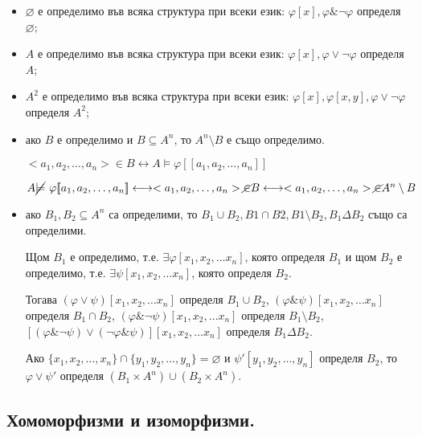 \documentclass{article}
\begin{document}
\begin{prop}
$\ $
\begin{itemize}
\item $\varnothing$ е определимо във всяка структура при всеки език: $\varphi[x], \varphi \& \neg\varphi$ определя $\varnothing$; 
\item $A$ е определимо във всяка структура при всеки език: $\varphi[x], \varphi \lor \neg\varphi$ определя $A$;
\item $A^2$ е определимо във всяка структура при всеки език: $\varphi[x], \varphi[x, y], \varphi \lor \neg\varphi$ определя $A^2$;
\item ако $B$ е определимо и $B \subseteq A^n$, то $A^n \setminus B$ е също определимо. 

$<a_1, a_2, \ldots, a_n> \in B \longleftrightarrow A \models \varphi[\![a_1, a_2, \ldots, a_n]\!]$

$A \cancel{\models}\ \varphi[\![a_1, a_2, \ldots, a_n]\!]\longleftrightarrow <a_1, a_2, \ldots, a_n> \cancel{\in} B \longleftrightarrow <a_1, a_2, \ldots, a_n> \cancel{\in} A^n \setminus B$
\item ако $B_1, B_2 \subseteq A^n$ са определими, то $B_1 \cup B_2, B1 \cap B2, B1 \setminus B_2, B_1 \Delta B_2$ също са определими.

Щом $B_1$ е определимо, т.е. $\exists \varphi[x_1, x_2, \ldots x_n]$, която определя $B_1$ и щом $B_2$ е определимо, т.е. $\exists \psi[x_1, x_2, \ldots x_n]$, която определя $B_2$.

Тогава $(\varphi\lor\psi)[x_1, x_2, \ldots x_n]$ определя $B_1 \cup B_2$, $(\varphi\&\psi)[x_1, x_2, \ldots x_n]$ определя $B_1 \cap B_2$, $(\varphi\&\neg\psi)[x_1, x_2, \ldots x_n]$ определя $B_1 \setminus B_2$, $[(\varphi\&\neg\psi)\lor(\neg\varphi\&\psi)][x_1, x_2, \ldots x_n]$ определя $B_1 \Delta B_2$.

Ако $\{x_1, x_2, \ldots, x_n\} \cap \{y_1, y_2, \ldots, y_n\} = \varnothing$ и $\psi'[y_1, y_2, \ldots, y_n]$ определя $B_2$, то $\varphi\lor\psi'$ определя $(B_1 \times A^n) \cup (B_2 \times A^n)$.

\end{itemize}
\end{prop}

\subsection*{Хомоморфизми и изоморфизми.}
\end{document}
